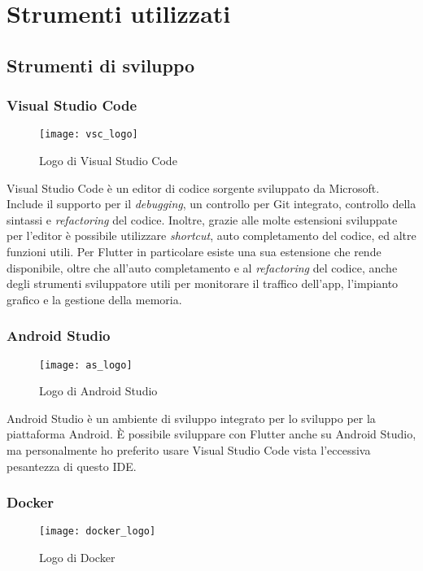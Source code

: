 
\chapter{Strumenti utilizzati}
\label{cap:strumenti-utilizzati}

\section{Strumenti di sviluppo}
\subsection{Visual Studio Code}
\begin{figure}[ht]
    \centering
    \texttt{[image: vsc\_logo]}
    \caption{Logo di Visual Studio Code}
\end{figure}
Visual Studio Code è un editor di codice sorgente sviluppato da Microsoft. Include il supporto per il \textit{debugging}, un controllo per Git integrato, controllo della sintassi e \textit{refactoring} del codice. Inoltre, grazie alle molte estensioni sviluppate per l'editor è possibile utilizzare \textit{shortcut}, auto completamento del codice, ed altre funzioni utili. Per Flutter in particolare esiste una sua estensione che rende disponibile, oltre che all'auto completamento e al \textit{refactoring} del codice, anche degli strumenti sviluppatore utili per monitorare il traffico dell'app, l'impianto grafico e la gestione della memoria.

\subsection{Android Studio}
\begin{figure}[ht]
    \centering
    \texttt{[image: as\_logo]}
    \caption{Logo di Android Studio}
\end{figure}

Android Studio è un ambiente di sviluppo integrato per lo sviluppo per la piattaforma Android. È possibile sviluppare con Flutter anche su Android Studio, ma personalmente ho preferito usare Visual Studio Code vista l'eccessiva pesantezza di questo IDE.

\subsection{Docker}
\begin{figure}[ht]
    \centering
    \texttt{[image: docker\_logo]}
    \caption{Logo di Docker}
\end{figure}

